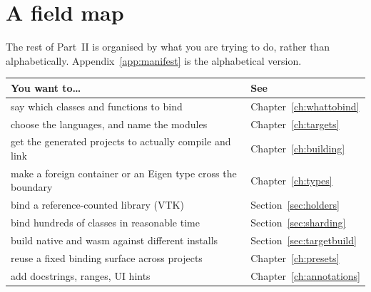 \section{A field map}

The rest of Part~II is organised by what you are trying to do, rather than
alphabetically. Appendix~\ref{app:manifest} is the alphabetical version.

\begin{center}
\small
\begin{tabular}{@{}L{5.6cm}l@{}}
\toprule
\textbf{You want to\ldots} & \textbf{See} \\
\midrule
say which classes and functions to bind &
  Chapter~\ref{ch:whattobind} \\
choose the languages, and name the modules &
  Chapter~\ref{ch:targets} \\
get the generated projects to actually compile and link &
  Chapter~\ref{ch:building} \\
make a foreign container or an Eigen type cross the boundary &
  Chapter~\ref{ch:types} \\
bind a reference-counted library (VTK) &
  Section~\ref{sec:holders} \\
bind hundreds of classes in reasonable time &
  Section~\ref{sec:sharding} \\
build native and wasm against different installs &
  Section~\ref{sec:targetbuild} \\
reuse a fixed binding surface across projects &
  Chapter~\ref{ch:presets} \\
add docstrings, ranges, UI hints &
  Chapter~\ref{ch:annotations} \\
\bottomrule
\end{tabular}
\end{center}
